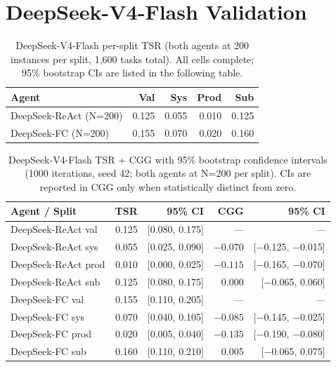 ﻿\documentclass{article}
\begin{document}
\section{DeepSeek-V4-Flash Validation}
\label{app:deepseek-full}

\begin{table}[h]
    \centering
    \small
    \begin{tabular}{lrrrr}
        \toprule
        Agent & Val & Sys & Prod & Sub \\
        \midrule
        DeepSeek-ReAct (N=200) & 0.125 & 0.055 & 0.010 & 0.125 \\
        DeepSeek-FC (N=200)    & 0.155 & 0.070 & 0.020 & 0.160 \\
        \bottomrule
    \end{tabular}
    \caption{DeepSeek-V4-Flash per-split TSR (both agents at 200 instances per split, 1{,}600 tasks total). All cells complete; 95\% bootstrap CIs are listed in the following table.}
    \label{tab:deepseek-full}
\end{table}

\begin{table}[h]
    \centering
    \small
    \begin{tabular}{lrrrr}
        \toprule
        Agent / Split & TSR & 95\% CI & CGG & 95\% CI \\
        \midrule
        DeepSeek-ReAct val         & 0.125 & [0.080, 0.175] & ---  & --- \\
        DeepSeek-ReAct sys         & 0.055 & [0.025, 0.090] & $-0.070$ & [$-$0.125, $-$0.015] \\
        DeepSeek-ReAct prod        & 0.010 & [0.000, 0.025] & $-0.115$ & [$-$0.165, $-$0.070] \\
        DeepSeek-ReAct sub         & 0.125 & [0.080, 0.175] & 0.000 & [$-$0.065, 0.060] \\
        \midrule
        DeepSeek-FC val            & 0.155 & [0.110, 0.205] & --- & --- \\
        DeepSeek-FC sys            & 0.070 & [0.040, 0.105] & $-0.085$ & [$-$0.145, $-$0.025] \\
        DeepSeek-FC prod           & 0.020 & [0.005, 0.040] & $-0.135$ & [$-$0.190, $-$0.080] \\
        DeepSeek-FC sub            & 0.160 & [0.110, 0.210] & 0.005 & [$-$0.065, 0.075] \\
        \bottomrule
    \end{tabular}
    \caption{DeepSeek-V4-Flash TSR + CGG with 95\% bootstrap confidence intervals (1000 iterations, seed 42; both agents at N=200 per split). CIs are reported in CGG only when statistically distinct from zero.}
    \label{tab:deepseek-ci}
\end{table}
\end{document}
